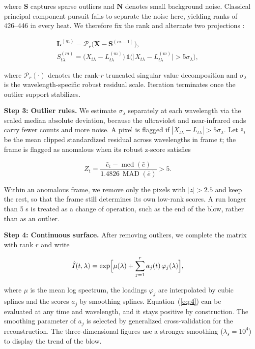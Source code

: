 where $\bm{S}$ captures sparse outliers and $\bm{N}$ denotes small background noise. Classical principal component pursuit \cite{ref:1} fails to separate the noise here, yielding ranks of 426–446 in every heat. We therefore fix the rank and alternate two projections \cite{ref:2}:

\begin{equation}
\begin{gathered}
  \bm{L}^{(m)} = \mathcal{P}_r\!\bigl(\bm{X}-\bm{S}^{(m-1)}\bigr), \\
  S^{(m)}_{t\lambda} = \bigl(X_{t\lambda}-L^{(m)}_{t\lambda}\bigr)\,\mathbb{1}\!\bigl(\lvert X_{t\lambda}-L^{(m)}_{t\lambda}\rvert > 5\sigma_\lambda\bigr),
\end{gathered} \label{eq:rlr_alt}
\end{equation}

where $\mathcal{P}_r(\cdot)$ denotes the rank-$r$ truncated singular value decomposition and $\sigma_\lambda$ is the wavelength-specific robust residual scale. Iteration terminates once the outlier support stabilizes.

\textbf{Step 3: Outlier rules.} We estimate $\sigma_\lambda$ separately at each wavelength via the scaled median absolute deviation, because the ultraviolet and near-infrared ends carry fewer counts and more noise. A pixel is flagged if $|X_{t\lambda}-L_{t\lambda}| > 5\sigma_\lambda$. Let $\bar{e}_t$ be the mean clipped standardized residual across wavelengths in frame $t$; the frame is flagged as anomalous when its robust z-score satisfies

\begin{equation}
Z_t = \frac{\bar{e}_t - \operatorname{med}(\bar{e})}{1.4826\,\operatorname{MAD}(\bar{e})} > 5. \label{eq:frame_z}
\end{equation}

Within an anomalous frame, we remove only the pixels with $|z|>2.5$ and keep the rest, so that the frame still determines its own low-rank scores. A run longer than 5 s is treated as a change of operation, such as the end of the blow, rather than as an outlier.

\textbf{Step 4: Continuous surface.} After removing outliers, we complete the matrix with rank $r$ and write

\begin{equation}
\hat{I}(t,\lambda) = \exp\Bigl[\mu(\lambda) + \sum_{j=1}^{r} a_j(t)\,\varphi_j(\lambda)\Bigr], \label{eq:4}
\end{equation}

where $\mu$ is the mean log spectrum, the loadings $\varphi_j$ are interpolated by cubic splines and the scores $a_j$ by smoothing splines. Equation~(\ref{eq:4}) can be evaluated at any time and wavelength, and it stays positive by construction. The smoothing parameter of $a_j$ is selected by generalized cross-validation for the reconstruction. The three-dimensional figures use a stronger smoothing ($\lambda_s = 10^4$) to display the trend of the blow.

